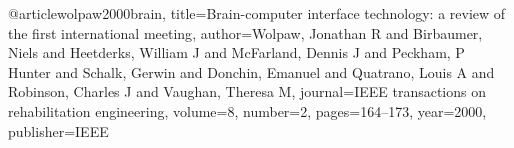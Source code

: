 @article{wolpaw2000brain,
  title={Brain-computer interface technology: a review of the first international meeting},
  author={Wolpaw, Jonathan R and Birbaumer, Niels and Heetderks, William J and McFarland, Dennis J and Peckham, P Hunter and Schalk, Gerwin and Donchin, Emanuel and Quatrano, Louis A and Robinson, Charles J and Vaughan, Theresa M},
  journal={IEEE transactions on rehabilitation engineering},
  volume={8},
  number={2},
  pages={164--173},
  year={2000},
  publisher={IEEE}
}

